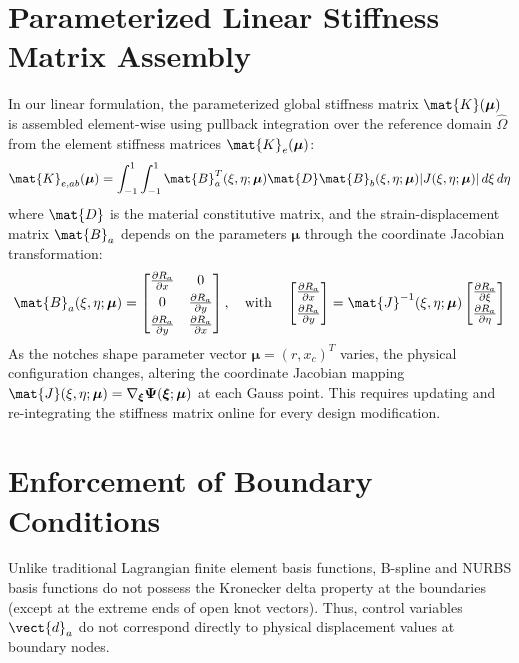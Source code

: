 \section{Parameterized Linear Stiffness Matrix Assembly}
In our linear formulation, the parameterized global stiffness matrix $\mat{K}(\boldsymbol{\mu})$ is assembled element-wise using pullback integration over the reference domain $\hat{\Omega}$ from the element stiffness matrices $\mat{K}_e(\boldsymbol{\mu})$:
\begin{equation}
    \mat{K}_{e, ab}(\boldsymbol{\mu}) = \int_{-1}^{1} \int_{-1}^{1} \mat{B}_a^T(\xi, \eta; \boldsymbol{\mu}) \mat{D} \mat{B}_b(\xi, \eta; \boldsymbol{\mu}) |J(\xi, \eta; \boldsymbol{\mu})| \, d\xi \, d\eta
\end{equation}
where $\mat{D}$ is the material constitutive matrix, and the strain-displacement matrix $\mat{B}_a$ depends on the parameters $\boldsymbol{\mu}$ through the coordinate Jacobian transformation:
\begin{equation}
    \mat{B}_a(\xi, \eta; \boldsymbol{\mu}) = \begin{bmatrix} \frac{\partial R_a}{\partial x} & 0 \\[0.3em] 0 & \frac{\partial R_a}{\partial y} \\[0.3em] \frac{\partial R_a}{\partial y} & \frac{\partial R_a}{\partial x} \end{bmatrix}, \quad \text{with} \quad \begin{bmatrix} \frac{\partial R_a}{\partial x} \\[0.3em] \frac{\partial R_a}{\partial y} \end{bmatrix} = \mat{J}^{-1}(\xi, \eta; \boldsymbol{\mu}) \begin{bmatrix} \frac{\partial R_a}{\partial \xi} \\[0.3em] \frac{\partial R_a}{\partial \eta} \end{bmatrix}
\end{equation}
As the notches shape parameter vector $\boldsymbol{\mu} = (r, x_c)^T$ varies, the physical configuration changes, altering the coordinate Jacobian mapping $\mat{J}(\xi, \eta; \boldsymbol{\mu}) = \nabla_{\boldsymbol{\xi}}\boldsymbol{\Psi}(\boldsymbol{\xi}; \boldsymbol{\mu})$ at each Gauss point. This requires updating and re-integrating the stiffness matrix online for every design modification.

\section{Enforcement of Boundary Conditions}
Unlike traditional Lagrangian finite element basis functions, B-spline and NURBS basis functions do not possess the Kronecker delta property at the boundaries (except at the extreme ends of open knot vectors). Thus, control variables $\vect{d}_a$ do not correspond directly to physical displacement values at boundary nodes.

